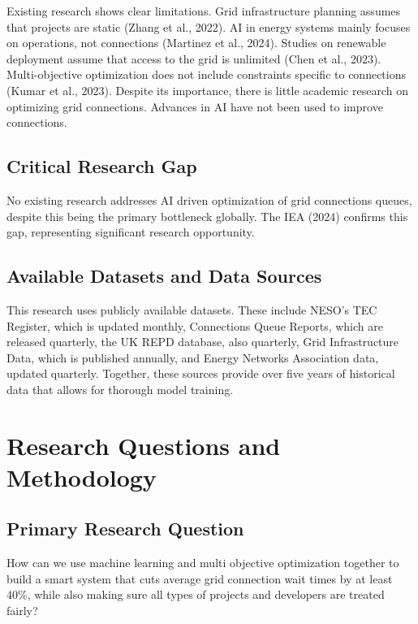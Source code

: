 \documentclass[12pt,a4paper]{article}
\begin{document}
Existing research shows clear limitations. Grid infrastructure planning assumes that projects are static (Zhang et al., 2022). AI in energy systems mainly focuses on operations, not connections (Martinez et al., 2024). Studies on renewable deployment assume that access to the grid is unlimited (Chen et al., 2023). Multi-objective optimization does not include constraints specific to connections (Kumar et al., 2023). Despite its importance, there is little academic research on optimizing grid connections. Advances in AI have not been used to improve connections.

\subsection{Critical Research Gap}

No existing research addresses AI driven optimization of grid connections queues, despite this being the primary bottleneck globally. The IEA (2024) confirms this gap, representing significant research opportunity.

\subsection{Available Datasets and Data Sources}

This research uses publicly available datasets. These include NESO’s TEC Register, which is updated monthly, Connections Queue Reports, which are released quarterly, the UK REPD database, also quarterly, Grid Infrastructure Data, which is published annually, and Energy Networks Association data, updated quarterly. Together, these sources provide over five years of historical data that allows for thorough model training.


\section{Research Questions and Methodology}
\label{sec:research}

\subsection{Primary Research Question}

How can we use machine learning and multi objective optimization together to build a smart system that cuts average grid connection wait times by at least 40\%, while also making sure all types of projects and developers are treated fairly?
\end{document}
